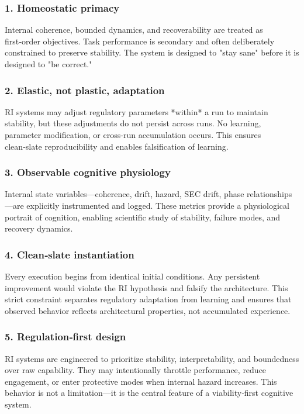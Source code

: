 \documentclass[12pt,a4paper]{report}
\begin{document}
\subsubsection{1. Homeostatic primacy}  
Internal coherence, bounded dynamics, and recoverability are treated as first‑order objectives. Task performance is secondary and often deliberately constrained to preserve stability. The system is designed to "stay sane" before it is designed to "be correct."

\subsubsection{2. Elastic, not plastic, adaptation}  
RI systems may adjust regulatory parameters *within* a run to maintain stability, but these adjustments do not persist across runs. No learning, parameter modification, or cross‑run accumulation occurs. This ensures clean‑slate reproducibility and enables falsification of learning.

\subsubsection{3. Observable cognitive physiology}  
Internal state variables—coherence, drift, hazard, SEC drift, phase relationships—are explicitly instrumented and logged. These metrics provide a physiological portrait of cognition, enabling scientific study of stability, failure modes, and recovery dynamics.

\subsubsection{4. Clean‑slate instantiation}  
Every execution begins from identical initial conditions. Any persistent improvement would violate the RI hypothesis and falsify the architecture. This strict constraint separates regulatory adaptation from learning and ensures that observed behavior reflects architectural properties, not accumulated experience.

\subsubsection{5. Regulation‑first design}  
RI systems are engineered to prioritize stability, interpretability, and boundedness over raw capability. They may intentionally throttle performance, reduce engagement, or enter protective modes when internal hazard increases. This behavior is not a limitation—it is the central feature of a viability‑first cognitive system.
\end{document}
